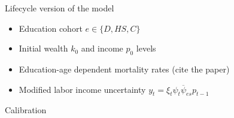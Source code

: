 \documentclass{beamer}
\begin{document}
 
\begin{frame}{Lifecycle version of the model}
\begin{itemize}
\item Education cohort $e \in \{D, HS, C\}$
\item Initial wealth $k_0$ and income $p_0$ levels
\item Education-age dependent mortality rates (cite the paper)
\item Modified labor income uncertainty $y_t = \xi_t \psi_t \overline{\psi}_{es} p_{t-1}$
\end{itemize}
\end{frame}


\begin{frame}{Calibration}
\end{frame}
\end{document}
